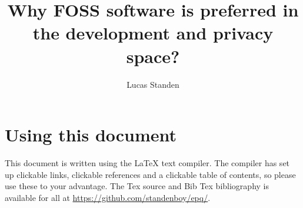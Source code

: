 \documentclass[a4paper,12pt]{article}
\author{Lucas Standen}
\title{Why FOSS software is preferred in the development and privacy space?}
\begin{document}
\maketitle

\newpage

\section{Using this document}
This document is written using the {\LaTeX} text compiler. The compiler has set up clickable links,
clickable references and a clickable table of contents, so please use these to your advantage. 
The Tex source and Bib Tex bibliography is available for all at 
\url{https://github.com/standenboy/epq/}.

\tableofcontents
\newpage

\setlength{\parskip}{1em}
\end{document}
